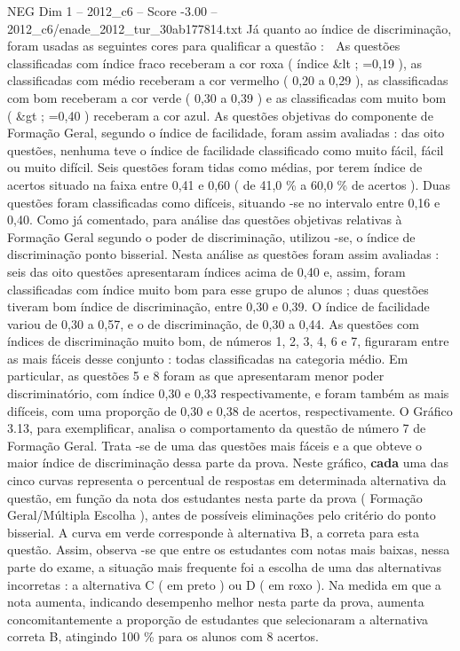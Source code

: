 \begin{textsample}{NEG Dim 1 – 2012\_c6 – Score -3.00 – 2012\_c6/enade\_2012\_tur\_30ab177814.txt}
Já quanto ao índice de discriminação, foram usadas as seguintes cores para qualificar a questão :  As questões classificadas com índice fraco receberam a cor roxa ( índice \&lt ; =0,19 ), as classificadas com médio receberam a cor vermelho ( 0,20 a 0,29 ), as classificadas com bom receberam a cor verde ( 0,30 a 0,39 ) e as classificadas com muito bom ( \&gt ; =0,40 ) receberam a cor azul.
As questões objetivas do componente de Formação Geral, segundo o índice de facilidade, foram assim avaliadas : das oito questões, nenhuma teve o índice de facilidade classificado como muito fácil, fácil ou muito difícil.
Seis questões foram tidas como médias, por terem índice de acertos situado na faixa entre 0,41 e 0,60 ( de 41,0 \% a 60,0 \% de acertos ).
Duas questões foram classificadas como difíceis, situando -se no intervalo entre 0,16 e 0,40.
Como já comentado, para análise das questões objetivas relativas à Formação Geral segundo o poder de discriminação, utilizou -se, o índice de discriminação ponto bisserial.
Nesta análise as questões foram assim avaliadas : seis das oito questões apresentaram índices acima de 0,40 e, assim, foram classificadas com índice muito bom para esse grupo de alunos ; duas questões tiveram bom índice de discriminação, entre 0,30 e 0,39.
O índice de facilidade variou de 0,30 a 0,57, e o de discriminação, de 0,30 a 0,44.
As questões com índices de discriminação muito bom, de números 1, 2, 3, 4, 6 e 7, figuraram entre as mais fáceis desse conjunto : todas classificadas na categoria médio.
Em particular, as questões 5 e 8 foram as que apresentaram menor poder discriminatório, com índice 0,30 e 0,33 respectivamente, e foram também as mais difíceis, com uma proporção de 0,30 e 0,38 de acertos, respectivamente.
O Gráfico 3.13, para exemplificar, analisa o comportamento da questão de número 7 de Formação Geral.
Trata -se de uma das questões mais fáceis e a que obteve o maior índice de discriminação dessa parte da prova.
Neste gráfico, \textbf{cada} uma das cinco curvas representa o percentual de respostas em determinada alternativa da questão, em função da nota dos estudantes nesta parte da prova ( Formação Geral/Múltipla Escolha ), antes de possíveis eliminações pelo critério do ponto bisserial.
A curva em verde corresponde à alternativa B, a correta para esta questão.
Assim, observa -se que entre os estudantes com notas mais baixas, nessa parte do exame, a situação mais frequente foi a escolha de uma das alternativas incorretas : a alternativa C ( em preto ) ou D ( em roxo ).
Na medida em que a nota aumenta, indicando desempenho melhor nesta parte da prova, aumenta concomitantemente a proporção de estudantes que selecionaram a alternativa correta B, atingindo 100 \% para os alunos com 8 acertos.

\end{textsample}

